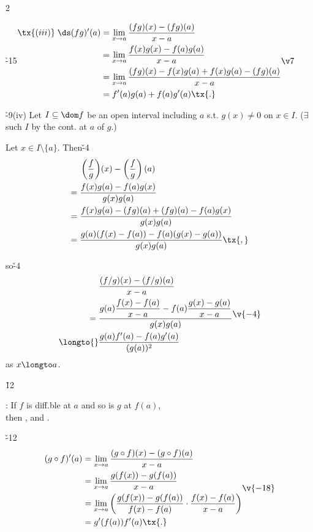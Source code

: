\documentclass[dvipdfmx,a4paper,titlepage,9pt]{jsarticle}
\begin{document}
\begin{multicols*}{2}
\begin{Pfbox}
\h{-15}$\begin{aligned}\tx{(iii)}\;\ds(fg)'(a)&=\lim_{x\to a}\frac{(fg)(x)-(fg)(a)}{x-a}\\&=\lim_{x\to a}\frac{f(x)g(x)-f(a)g(a)}{x-a} \\&=\lim_{x\to a}\frac{(fg)(x)-f(x)g(a)+f(x)g(a)-(fg)(a)}{x-a}\\&=f'(a)g(a)+f(a)g'(a)\tx{.}\end{aligned}\v7$

\h{-9}(iv) Let $I\subseteq \dom f$ be an open interval including $a$ s.t. $g(x)\neq 0$ on $x\in I$. ($\exists$ such $I$ by the cont. at $a$ of $g$.)

Let $x\in I\setminus\{a\}$. Then\v{-4}
$$\begin{aligned}&\left(\frac fg\right)\!(x)-\left(\frac fg\right)(a)\\={}&\frac{f(x)g(a)-f(a)g(x)}{g(x)g(a)} \\
={}&\frac{f(x)g(a)-(fg)(a)+(fg)(a)-f(a)g(x)}{g(x)g(a)} \\
={}&\frac{g(a)(f(x)-f(a))-f(a)(g(x)-g(a))}{g(x)g(a)}\tx{,}
\end{aligned}$$

so\v{-4}
$$\begin{aligned}&\frac{(f/g)(x)-(f/g)(a)}{x-a}\\={}&\frac{g(a)\dfrac{f(x)-f(a)}{x-a}-f(a)\dfrac{g(x)-g(a)}{x-a}}{g(x)g(a)} \\
\longto{}&\frac{g(a)f'(a)-f(a)g'(a)}{(g(a))^2}\end{aligned}\v{-4}$$
as $x\longto a$.
\end{Pfbox}\v{12}


: If $f$ is diff.ble at $a$ and so is $g$ at $f(a)$, \\
\quad then , and .

\begin{Pfbox}
\v{-12}
$$\begin{aligned}(g\circ f)'(a)&=\lim_{x\to a}\frac{(g\circ f)(x)-(g\circ f)(a)}{x-a} \\
&=\lim_{x\to a}\frac{g(f(x))-g(f(a))}{x-a} \\
&=\lim_{x\to a}\left(\frac{g(f(x))-g(f(a))}{f(x)-f(a)}\cdot\frac{f(x)-f(a)}{x-a}\right) \\
&=g'(f(a))f'(a)\tx{.}
\end{aligned}\v{-18}$$
\end{Pfbox}


\end{multicols*}
\end{document}

